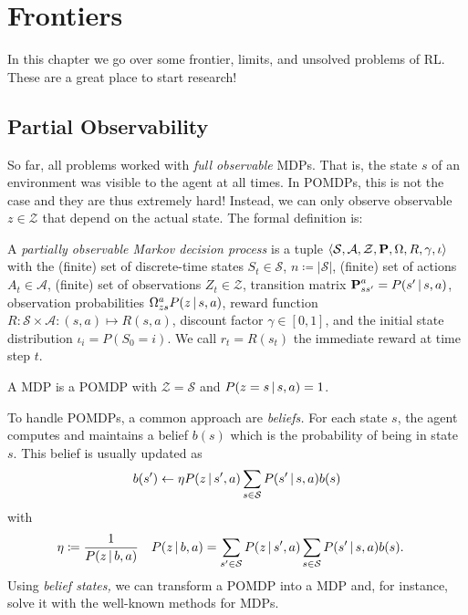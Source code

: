 \chapter{Frontiers}
	In this chapter we go over some frontier, limits, and unsolved problems of \ac{RL}. These are a great place to start research!

	\section{Partial Observability}
		So far, all problems worked with \emph{full observable} \acp{MDP}. That is, the state \(s\) of an environment was visible to the agent at all times. In \acp{POMDP}, this is not the case and they are thus extremely hard! Instead, we can only observe observable \(z \in \mathcal{Z}\) that depend on the actual state. The formal definition is:
		\begin{definition}
			A \emph{partially observable Markov decision process} is a tuple \( \langle \mathcal{S}, \mathcal{A}, \mathcal{Z}, \bm{\mathrm{P}}, \Omega, R, \gamma, \iota \rangle \) with the (finite) set of discrete-time states \(S_t \in \mathcal{S}\), \(n \coloneqq \lvert \mathcal{S} \rvert\), (finite) set of actions \(A_t \in \mathcal{A}\), (finite) set of observations \(Z_t \in \mathcal{Z}\), transition matrix \( \bm{\mathrm{P}}_{ss'}^{a} = P(s' \,\vert\, s, a) \), observation probabilities \( \Omega_{zs}^{a} P(z \,\vert\, s, a) \), reward function \( R : \mathcal{S} \times \mathcal{A} : (s, a) \mapsto R(s, a) \), discount factor \( \gamma \in [0, 1] \), and the initial state distribution \( \iota_i = P(S_0 = i) \). We call \( r_t = R(s_t) \) the immediate reward at time step \(t\).
		\end{definition}
		\begin{remark}
			A \ac{MDP} is a \ac{POMDP} with \(\mathcal{Z} = \mathcal{S}\) and \( P(z = s \,\vert\, s, a) = 1 \).
		\end{remark}
		To handle \acp{POMDP}, a common approach are \emph{beliefs.} For each state \(s\), the agent computes and maintains a belief \(b(s)\) which is the probability of being in state \(s\). This belief is usually updated as
		\begin{equation}
			b(s') \gets \eta P(z \,\vert\, s', a) \sum_{s \in \mathcal{S}} P(s' \,\vert\, s, a) b(s)
		\end{equation}
		with
		\begin{align}
			\eta &\coloneqq \frac{1}{P(z \,\vert\, b, a)} &
			P(z \,\vert\, b, a) &= \sum_{s' \in \mathcal{S}} P(z \,\vert\, s', a) \sum_{s \in \mathcal{S}} P(s' \,\vert\, s, a) b(s).
		\end{align}
		Using \emph{belief states,} we can transform a \ac{POMDP} into a \ac{MDP} and, for instance, solve it with the well-known methods for \acp{MDP}.

